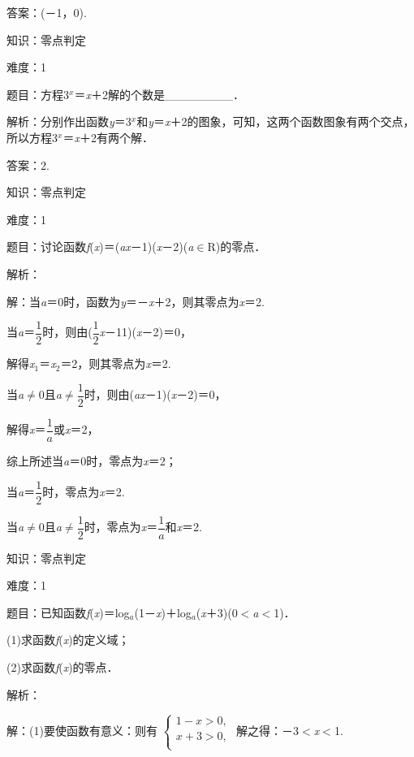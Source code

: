 \documentclass{article} %
\begin{document}
答案：(－1，0).

知识：零点判定

难度：1

题目：方程3\textit{${}^{x}$}＝\textit{x}＋2解的个数是\_\_\_\_\_\_\_\_．

解析：分别作出函数\textit{y}＝3\textit{${}^{x}$}和\textit{y}＝\textit{x}＋2的图象，可知，这两个函数图象有两个交点，所以方程3\textit{${}^{x}$}＝\textit{x}＋2有两个解．

答案：2.

知识：零点判定

难度：1

题目：讨论函数\textit{f}(\textit{x})＝(\textit{ax}－1)(\textit{x}－2)(\textit{a}$\mathrm{\in}$R)的零点．

解析：

解：当\textit{a}＝0时，函数为\textit{y}＝－\textit{x}＋2，则其零点为\textit{x}＝2.

当\textit{a}＝$\dfrac{1}{2}$时，则由($\dfrac{1}{2}$\textit{x}－11)(\textit{x}－2)＝0，

解得\textit{x}${}_{1}$＝\textit{x}${}_{2}$＝2，则其零点为\textit{x}＝2.

当\textit{a}$\mathrm{\neq}$0且\textit{a}$\mathrm{\neq}\dfrac{1}{2}$时，则由(\textit{ax}－1)(\textit{x}－2)＝0，

解得\textit{x}＝$\dfrac{1}{a}$或\textit{x}＝2，

综上所述当\textit{a}＝0时，零点为\textit{x}＝2；

当\textit{a}＝$\dfrac{1}{2}$时，零点为\textit{x}＝2.

当\textit{a}$\mathrm{\neq}$0且\textit{a}$\mathrm{\neq}\dfrac{1}{2}$时，零点为\textit{x}＝$\dfrac{1}{a}$和\textit{x}＝2.

知识：零点判定

难度：1

题目：已知函数\textit{f}(\textit{x})＝log\textit{${}_{a}$}(1－\textit{x})＋log\textit{${}_{a}$}(\textit{x}＋3)(0$\mathrm{<}$\textit{a}$\mathrm{<}$1)．

(1)求函数\textit{f}(\textit{x})的定义域；

(2)求函数\textit{f}(\textit{x})的零点．

解析：

解：(1)要使函数有意义：则有
$\left\{
\begin{array}{l}
1-x>0,\\
x+3>0,\\
\end{array}
\right.$
解之得：－3$\mathrm{<}$\textit{x}$\mathrm{<}$1.
\end{document}

